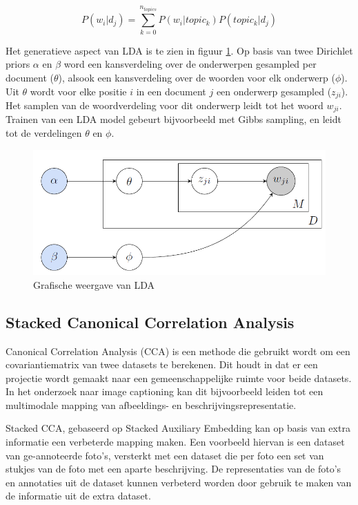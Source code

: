 \begin{equation}
    P(w_i | d_j) = \sum\limits_{k=0}^{n_{topics}}P(w_i|topic_k)P(topic_k|d_j)
    \label{formule:lda}
\end{equation}

Het generatieve aspect van LDA is te zien in figuur \ref{fig:lda}. Op basis van twee Dirichlet priors $\alpha$ en $\beta$ word een kansverdeling over de onderwerpen gesampled per document ($\theta$), alsook een kansverdeling over de woorden voor elk onderwerp ($\phi$). Uit $\theta$ wordt voor elke positie $i$ in een document $j$ een onderwerp gesampled ($z_{ji}$). Het samplen van de woordverdeling voor dit onderwerp leidt tot het woord $w_{ji}$. Trainen van een LDA model gebeurt bijvoorbeeld met Gibbs sampling, en leidt tot de verdelingen $\theta$ en $\phi$.

\begin{figure}[tb]
    \centering
    \includegraphics[width=\linewidth]{Images/lda.png}
    \caption{Grafische weergave van LDA}
    \label{fig:lda}
\end{figure}


\subsection{Stacked Canonical Correlation Analysis}
Canonical Correlation Analysis (CCA) is een methode die gebruikt wordt om een covariantiematrix van twee datasets te berekenen. Dit houdt in dat er een projectie wordt gemaakt naar een gemeenschappelijke ruimte voor beide datasets. In het onderzoek naar image captioning kan dit bijvoorbeeld leiden tot een multimodale mapping van afbeeldings- en beschrijvingsrepresentatie. 

Stacked CCA, gebaseerd op Stacked Auxiliary Embedding kan op basis van extra informatie een verbeterde mapping maken. Een voorbeeld hiervan is een dataset van ge-annoteerde foto's, versterkt met een dataset die per foto een set van stukjes van de foto met een aparte beschrijving. De representaties van de foto's en annotaties uit de dataset kunnen verbeterd worden door gebruik te maken van de informatie uit de extra dataset.

